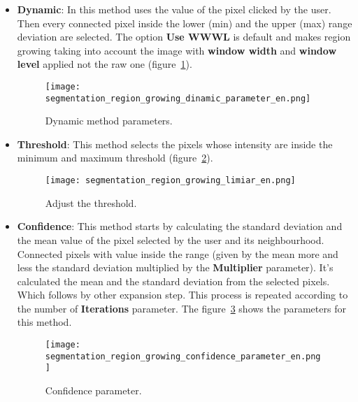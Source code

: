 \begin{itemize}
	\item \textbf{Dynamic}: In this method uses the value of the pixel clicked by the user. Then every connected pixel inside the lower (min) and the upper (max) range deviation are selected. The option \textbf{Use WWWL} is default and makes region growing taking into account the image with \textbf{window width} and \textbf{window level} applied not the raw one (figure~\ref{fig:segmentation_region_growing_dinamic_parameter}).

	\begin{figure}[!htb]
	\centering
	\texttt{[image: segmentation\_region\_growing\_dinamic\_parameter\_en.png]}
	\caption{Dynamic method parameters.}
	\label{fig:segmentation_region_growing_dinamic_parameter}
	\end{figure}

	\item \textbf{Threshold}: This method selects the pixels whose intensity are inside the minimum and maximum threshold (figure~\ref{fig:segmentation_region_growing_limiar}).

	\begin{figure}[!htb]
	\centering
	\texttt{[image: segmentation\_region\_growing\_limiar\_en.png]}
    \caption{Adjust the threshold.}
	\label{fig:segmentation_region_growing_limiar}
	\end{figure}

    \item \textbf{Confidence}: This method starts by calculating the standard deviation and the mean value of the pixel selected by the user and its neighbourhood. Connected pixels with value inside the range (given by the mean more and less the standard deviation multiplied by the \textbf{Multiplier} parameter). It's calculated the mean and the standard deviation from the selected pixels. Which follows by other expansion step. This process is repeated according to the number of \textbf{Iterations} parameter. The figure~\ref{fig:segmentation_region_growing_confidence_parameter} shows the parameters for this method.

	\begin{figure}[!htb]
	\centering
	\texttt{[image: segmentation\_region\_growing\_confidence\_parameter\_en.png]}
    \caption{Confidence parameter.}
	\label{fig:segmentation_region_growing_confidence_parameter}
	\end{figure}


\end{itemize}
